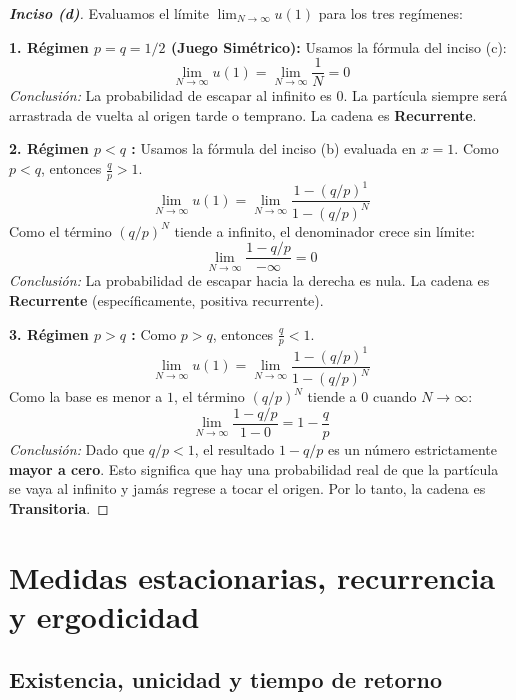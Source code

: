 \documentclass[10pt,a4paper]{article}
\begin{document}
\vspace{3mm}

\begin{proof}[\textbf{Inciso (d)}]
    Evaluamos el límite $\lim_{N \to \infty} u(1)$ para los tres regímenes:

    \textbf{1. Régimen $p = q = 1/2$ (Juego Simétrico):}
    Usamos la fórmula del inciso (c):
    \[ \lim_{N \to \infty} u(1) = \lim_{N \to \infty} \frac{1}{N} = 0 \]
    \textit{Conclusión:} La probabilidad de escapar al infinito es $0$. 
    La partícula siempre será arrastrada de vuelta al origen tarde o temprano. 
    La cadena es \textbf{Recurrente}.

    \vspace{3mm}

    \textbf{2. Régimen $p < q$ :}
    Usamos la fórmula del inciso (b) evaluada en $x=1$. Como $p < q$, entonces $\frac{q}{p} > 1$.
    \[ \lim_{N \to \infty} u(1) = \lim_{N \to \infty} \frac{1 - (q/p)^1}{1 - (q/p)^N} \]
    Como el término $(q/p)^N$ tiende a infinito, el denominador crece sin límite:
    \[ \lim_{N \to \infty} \frac{1 - q/p}{-\infty} = 0 \]
    \textit{Conclusión:} La probabilidad de escapar hacia la derecha es nula. 
    La cadena es \textbf{Recurrente} (específicamente, positiva recurrente).

    \vspace{3mm}

    \textbf{3. Régimen $p > q$ :}
    Como $p > q$, entonces $\frac{q}{p} < 1$.
    \[ \lim_{N \to \infty} u(1) = \lim_{N \to \infty} \frac{1 - (q/p)^1}{1 - (q/p)^N} \]
    Como la base es menor a $1$, el término $(q/p)^N$ tiende a $0$ cuando $N \to \infty$:
    \[ \lim_{N \to \infty} \frac{1 - q/p}{1 - 0} = 1 - \frac{q}{p} \]
    \textit{Conclusión:} Dado que $q/p < 1$, el resultado $1 - q/p$ 
    es un número estrictamente \textbf{mayor a cero}. 
    Esto significa que hay una probabilidad real de que la partícula se vaya al 
    infinito y jamás regrese a tocar el origen. Por lo tanto, la cadena es 
    \textbf{Transitoria}.
\end{proof}

\newpage


\section{Medidas estacionarias, recurrencia y ergodicidad}

\subsection{Existencia, unicidad y tiempo de retorno}
\end{document}
